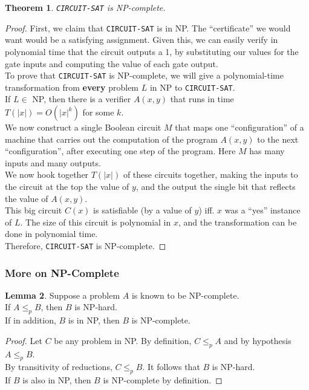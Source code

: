 \documentclass[12pt]{article}
\theoremstyle{plain}
\newtheorem{theorem}{Theorem}[subsection]
\theoremstyle{definition}
\newtheorem{lemma}[theorem]{Lemma}
\begin{document}
\begin{theorem}
\texttt{CIRCUIT-SAT} is NP-complete.
\end{theorem}
\begin{proof}
First, we claim that \texttt{CIRCUIT-SAT} is in NP.
The ``certificate'' we would want would be a satisfying assignment.
Given this, we can easily verify in polynomial time that the circuit outputs a 1, by substituting our values for the gate inputs and computing the value of each gate output. \\

To prove that \texttt{CIRCUIT-SAT} is NP-complete, we will give a polynomial-time transformation from \textbf{every} problem $L$ in NP to \texttt{CIRCUIT-SAT}. \\
If $L \in$ NP, then there is a verifier $A(x, y)$ that runs in time $T(|x|) = O(|x|^{k})$ for some $k$. \\
We now construct a single Boolean circuit $M$ that maps one ``configuration'' of a machine that carries out the computation of the program $A(x, y)$ to the next ``configuration'', after executing one step of the program.
Here $M$ has many inputs and many outputs. \\
We now hook together $T(|x|)$ of these circuits together, making the inputs to the circuit at the top the value of $y$, and the output the single bit that reflects the value of $A(x, y)$. \\
This big circuit $C(x)$ is satisfiable (by a value of $y$) iff. $x$ was a ``yes'' instance of $L$.
The size of this circuit is polynomial in $x$, and the transformation can be done in polynomial time. \\
Therefore, \texttt{CIRCUIT-SAT} is NP-complete.
\end{proof}

\subsubsection{More on NP-Complete}
\begin{lemma}
Suppose a problem $A$ is known to be NP-complete. \\
If $A \leq_{p} B$, then $B$ is NP-hard. \\
If in addition, $B$ is in NP, then $B$ is NP-complete.
\end{lemma}
\begin{proof}
Let $C$ be any problem in NP.
By definition, $C \leq_{p} A$ and by hypothesis $A \leq_{p} B$. \\
By transitivity of reductions, $C \leq_{p} B$.
It follows that $B$ is NP-hard. \\
If $B$ is also in NP, then $B$ is NP-complete by definition.
\end{proof}
\end{document}
